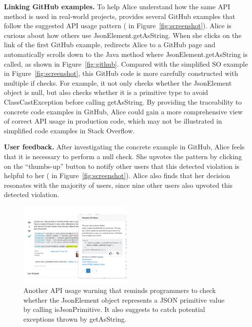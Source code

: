 {\bf Linking GitHub examples.} To help Alice understand how the same API method is used in real-world projects, {\tool} provides several GitHub examples that follow the suggested API usage pattern ( in Figure~\ref{fig:screenshot}). Alice is curious about how others use {\ttt JsonElement.getAsString}. When she clicks on the link of the first GitHub example, {\tool} redirects Alice to a GitHub page and automatically scrolls down to the Java method where {\ttt JsonElement.getAsString} is called, as shown in Figure~\ref{fig:github}. Compared with the simplified SO example in Figure~\ref{fig:screenshot}, this GitHub code is more carefully constructed with multiple {\ttt if} checks. For example, it not only checks whether the {\ttt JsonElement} object is {\ttt null}, but also checks whether it is a primitive type to avoid {\ttt ClassCastException} before calling {\ttt getAsString}. By providing the traceability to concrete code examples in GitHub, Alice could gain a more comprehensive view of correct API usage in production code, which may not be illustrated in simplified code examples in Stack Overflow. 

{\bf User feedback.} After investigating the concrete example in GitHub, Alice feels that it is necessary to perform a {\ttt null} check. She upvotes the pattern by clicking on the ``thumbs-up'' button to notify other users that this detected violation is helpful to her ( in Figure~\ref{fig:screenshot}). Alice also finds that her decision resonates with the majority of {\tool} users, since nine other users also upvoted this detected violation.

\begin{figure}
\centering
\includegraphics[width=0.5\textwidth]{examplecheck-page2.pdf}
  \caption{Another API usage warning that reminds programmers to check whether the {\ttt JsonElement} object represents a {\ttt JSON} primitive value by calling {\ttt isJsonPrimitive}. It also suggests to catch potential exceptions thrown by {\ttt getAsString}.}
  \label{fig:screenshot2}
\end{figure}

